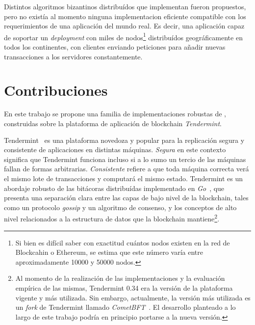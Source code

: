 %

Distintos algoritmos bizantinos distribuídos que implementan \setchain fueron
propuestos, pero no existía al momento ninguna implementacion eficiente compatible con
los requerimientos de una aplicación del mundo real.
Es decir, una aplicación capaz de soportar un \textit{deployment} con miles de nodos\footnote{Si bien
es difícil saber con exactitud cuántos nodos existen en la red de Blockcahin o Ethereum, se estima
que este número varía entre aproximadamente 10000 y 50000 nodos.}
distribuídos geográficamente en todos los continentes, con clientes enviando peticiones para
añadir nuevas transacciones a los servidores constantemente.

\section{Contribuciones}
En este trabajo se propone una familia de implementaciones robustas de \setchain,
construidas sobre la plataforma de aplicación de blockchain \textit{Tendermint}.



Tendermint~\cite{Buchman.2018.Tendermint} es una plataforma novedoza y popular para la
replicación segura y consistente de aplicaciones en distintas máquinas.
%
\textit{Segura} en este contexto significa que Tendermint funciona incluso si a lo sumo
un tercio de las máquinas fallan de formas arbitrarias.
%
\textit{Consistente} refiere a que toda máquina correcta verá el mismo lote de
transacciones y computará el mismo estado.
%
Tendermint es un abordaje robusto de las bitácoras distribuídas implementado
en \emph{Go}~\cite{donovan15go}, que presenta una separación clara entre las
capas de bajo nivel de la blockchain,
tales como un protocolo \textit{gossip} y un algoritmo de consenso, y los conceptos de alto
nivel relacionados a la estructura de datos que la blockchain mantiene\footnote{Al momento
de la realización de las implementaciones y la evaluación empírica de las mismas,
Tendermint 0.34 era la versión de la plataforma vigente y más utilizada. Sin embargo,
actualmente, la versión más utilizada es un \textit{fork} de Tendermint llamado \textit{CometBFT}~\cite{cometbft.repo}.
El desarrollo planteado a lo largo de este trabajo podría en principio portarse a la nueva versión.}.

